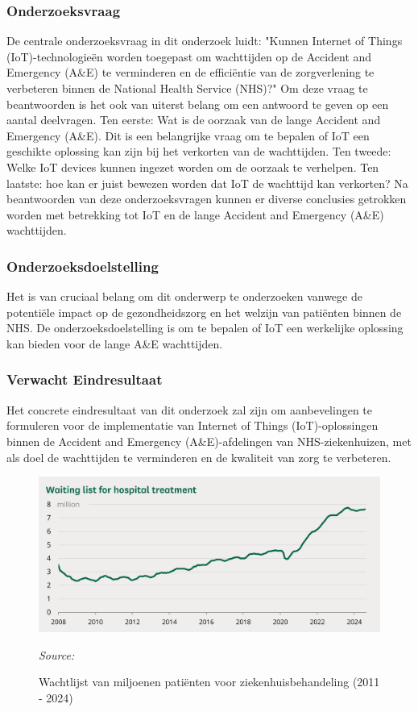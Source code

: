 \subsubsection*{Onderzoeksvraag}
De centrale onderzoeksvraag in dit onderzoek luidt: "Kunnen Internet of Things (IoT)-technologieën worden toegepast om wachttijden op de Accident and Emergency (A\&E) te verminderen en de efficiëntie van de zorgverlening te verbeteren binnen de National Health Service (NHS)?" Om deze vraag te beantwoorden is het ook van uiterst belang om een antwoord te geven op een aantal deelvragen. Ten eerste: Wat is de oorzaak van de lange Accident and Emergency (A\&E).  Dit is een belangrijke vraag om te bepalen of IoT een geschikte oplossing kan zijn bij het verkorten van de wachttijden. Ten tweede: Welke IoT devices kunnen ingezet worden om de oorzaak te verhelpen. Ten laatste: hoe kan er juist bewezen worden dat IoT de wachttijd kan verkorten? Na beantwoorden van deze onderzoeksvragen kunnen er diverse conclusies getrokken worden met betrekking tot IoT en de lange Accident and Emergency (A\&E) wachttijden.


\subsubsection*{Onderzoeksdoelstelling}
Het is van cruciaal belang om dit onderwerp te onderzoeken vanwege de potentiële impact op de gezondheidszorg en het welzijn van patiënten binnen de NHS. De onderzoeksdoelstelling is om te bepalen of IoT een werkelijke oplossing kan bieden voor de lange A\&E wachttijden.

\subsubsection*{Verwacht Eindresultaat}
Het concrete eindresultaat van dit onderzoek zal zijn om aanbevelingen te formuleren voor de implementatie van Internet of Things (IoT)-oplossingen binnen de Accident and Emergency (A\&E)-afdelingen van NHS-ziekenhuizen, met als doel de wachttijden te verminderen en de kwaliteit van zorg te verbeteren.

\begin{figure}[h]
    \centering
    \includegraphics[width=1\linewidth]{img/Figuur-0.png}
    \caption{Wachtlijst van miljoenen patiënten voor ziekenhuisbehandeling (2011 - 2024)}
    \label{fig:Figuur0}
    \textit{Source: \autocite{Stiebahl2024}}
\end{figure}


